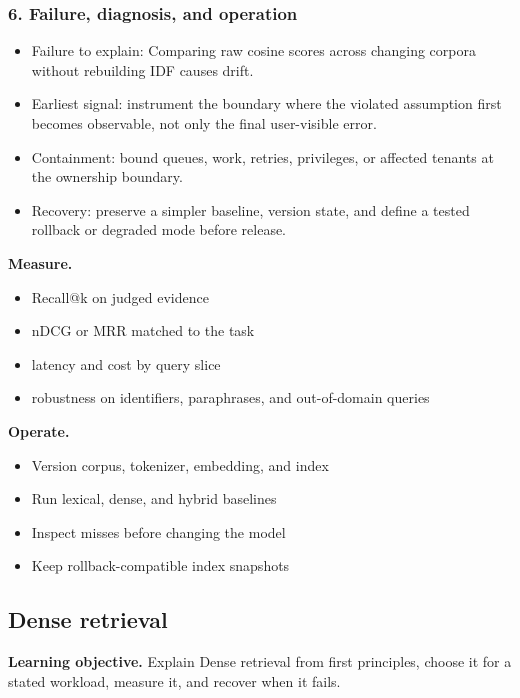 \subsubsection*{6. Failure, diagnosis, and operation}
\begin{itemize}
\item Failure to explain: Comparing raw cosine scores across changing corpora without rebuilding IDF causes drift.
\item Earliest signal: instrument the boundary where the violated assumption first becomes observable, not only the final user-visible error.
\item Containment: bound queues, work, retries, privileges, or affected tenants at the ownership boundary.
\item Recovery: preserve a simpler baseline, version state, and define a tested rollback or degraded mode before release.
\end{itemize}
\textbf{Measure.}\begin{itemize}
\item Recall@k on judged evidence
\item nDCG or MRR matched to the task
\item latency and cost by query slice
\item robustness on identifiers, paraphrases, and out-of-domain queries
\end{itemize}
\textbf{Operate.}\begin{itemize}
\item Version corpus, tokenizer, embedding, and index
\item Run lexical, dense, and hybrid baselines
\item Inspect misses before changing the model
\item Keep rollback-compatible index snapshots
\end{itemize}
\subsection{Dense retrieval}
\textbf{Learning objective.} Explain Dense retrieval from first principles, choose it for a stated workload, measure it, and recover when it fails.
